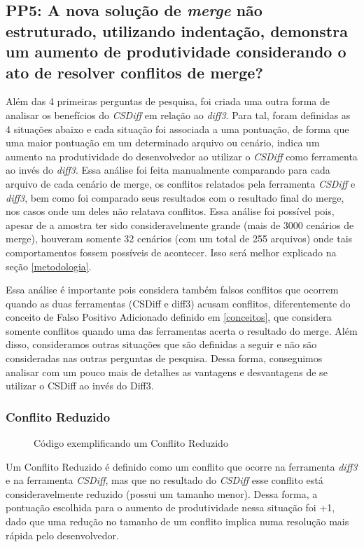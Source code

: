 \subsection{PP5: A nova solução de \emph{merge} não estruturado, utilizando indentação,
	demonstra um aumento de produtividade considerando o ato de resolver conflitos de merge?}\label{concept_PP5}
Além das 4 primeiras perguntas de pesquisa, foi criada uma outra forma de analisar os benefícios do \emph{CSDiff} em relação ao
\emph{diff3}.
Para tal, foram definidas as 4 situações abaixo e cada situação foi associada a uma pontuação, de forma que
uma maior pontuação em um determinado arquivo ou cenário, indica um aumento na produtividade do desenvolvedor ao
utilizar o \emph{CSDiff} como ferramenta ao invés do \emph{diff3}. Essa análise foi feita manualmente comparando para cada
arquivo
de cada cenário de merge, os conflitos relatados pela
ferramenta \emph{CSDiff} e \emph{diff3}, bem como foi comparado seus resultados
com o resultado final do merge, nos casos onde um deles não relatava conflitos. Essa análise foi possível pois, apesar de
a amostra ter sido consideravelmente grande (mais de 3000 cenários de merge), houveram somente 32 cenários (com um total de 255
arquivos) onde tais comportamentos fossem possíveis de acontecer. Isso será melhor explicado na seção \ref{metodologia}.

Essa análise é importante pois considera também falsos conflitos que ocorrem quando as duas ferramentas (CSDiff e diff3)
acusam conflitos, diferentemente do conceito de Falso Positivo Adicionado definido em \ref{conceitos}, que considera somente
conflitos quando uma das ferramentas acerta o resultado do merge.
Além disso, consideramos outras situações que são definidas a seguir e não são consideradas nas outras perguntas de
pesquisa. Dessa forma, conseguimos analisar com um pouco mais de detalhes as
vantagens e desvantagens de se utilizar o CSDiff ao invés
do Diff3.
\subsubsection{Conflito Reduzido}
\begin{figure}[ht]
	\begin{center}
        
		\caption{Código exemplificando um Conflito Reduzido}\label{conflito_reduzido}
	\end{center}
\end{figure}
Um Conflito Reduzido é definido como um conflito que ocorre na ferramenta \emph{diff3} e na ferramenta \emph{CSDiff},
mas que no resultado do \emph{CSDiff} esse conflito está consideravelmente reduzido (possui um tamanho menor). Dessa forma,
a pontuação escolhida para o aumento de produtividade nessa situação foi +1, dado que uma redução no tamanho de um conflito
implica numa resolução mais rápida pelo desenvolvedor.
